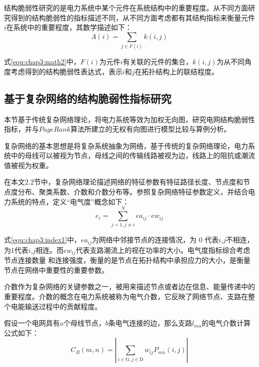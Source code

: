结构脆弱性研究的是电力系统中某个元件在系统结构中的重要程度。从不同方面研究得到的结构脆弱性的指标描述不同，从不同方面考虑都有其结构指标来衡量元件$i$在系统中的重要程度，其数学描述如下：
\begin{equation}
  \label{equ:chap3:math2}
  A(i)=\sum_{j\in F(i)}{k(i,j)}
\end{equation}

式\ref{equ:chap3:math2}中，$F(i)$为元件$i$有关联的元件的集合，$k(i,j)$为从不同角度考虑得到的结构脆弱性表达式，表示$i$和$j$在拓扑结构上的联结程度。



\subsection{基于复杂网络的结构脆弱性指标研究}
\label{sec:network}

本节基于传统复杂网络理论，将电力系统等效为加权无向图，研究电网结构脆弱性指标，并与$PageRank$算法所建立的无权有向图进行模型比较与算例分析。

复杂网络的基本思想是将复杂系统抽象为网络，基于传统的复杂网络理论，电力系统中的母线可以被视为节点，母线之间的传输线路被视为边，线路上的阻抗或潮流值被视为权重。

在本文2.2节中，复杂网络理论描述网络的特征参数有特征路径长度、节点度和节点度分布、聚类系数、介数和介数分布等。参照复杂网络特征参数定义，并结合电力系统的特点，定义“电气度”概念如下：
\begin{equation}
\label{equ:chap3:index1}
  e_{i}=\sum_{j=1, j \neq i}^{N} e a_{i j} \cdot e w_{i j}
  \end{equation}

式\ref{equ:chap3:index1}中，$e a_{i j}$为网络中邻接节点的连接情况，为 0 代表$i$,$j$不相连，为1代表$i$,$j$相连。而$ew_{ij}$代表支路潮流上的视在功率的大小。电气度指标综合考虑节点连接数量
和连接强度，衡量的是节点在拓扑结构中承担应力的大小，是衡量节点在网络中重要性的重要参数。

介数作为复杂网络的关键参数之一，被用来描述节点或者边在信息、能量传递中的重要程度。介数的概念在电力系统被称为电气介数，它反映了网络节点、支路在整个电能输送过程中的贡献程度\cite{refs66,refs67}。

假设一个电网具有$a$个母线节点，$b$条电气连接的边，那么支路$l_{mn}$的电气介数计算公式如下：
\begin{equation}
\label{equ:chap3:cb}
  C_{B}(m, n)=\left|\sum_{i \in \mathrm{G}, j \in \mathrm{D}} w_{i j} P_{m n}(i, j)\right|
  \end{equation}

